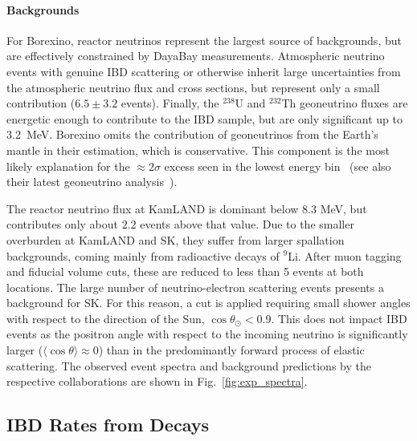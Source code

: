 \documentclass[
reprint,
superscriptaddress,
showpacs,
preprintnumbers,
nofootinbib,
nobibnotes,
amsmath,
amssymb, 
aps,
prd,
floatfix
]{revtex4-1}
\newcommand{\reffig}[1]{Fig.~\ref{#1}}
\begin{document}
\paragraph{Backgrounds} For Borexino, reactor neutrinos represent the largest source of backgrounds, but are effectively constrained by DayaBay measurements. Atmospheric neutrino events with genuine IBD scattering or otherwise inherit large uncertainties from the atmospheric neutrino flux and cross sections, but represent only a small contribution ($6.5\pm 3.2$ events). Finally, the $^{238}$U and $^{232}$Th geoneutrino fluxes are energetic enough to contribute to the IBD sample, but are only significant up to 3.2~MeV. Borexino omits the contribution of geoneutrinos from the Earth's mantle in their estimation, which is conservative. This component is the most likely explanation for the $\approx 2\sigma$ excess seen in the lowest energy bin~\cite{Agostini:2019yuq} (see also their latest geoneutrino analysis~\cite{Agostini:2019dbs}). 

The reactor neutrino flux at KamLAND is dominant below $8.3$ MeV, but contributes only about $2.2$ events above that value. Due to the smaller overburden at KamLAND and SK, they suffer from larger spallation backgrounds, coming mainly from radioactive decays of $^9$Li. After muon tagging and fiducial volume cuts, these are reduced to less than 5 events at both locations. The large number of neutrino-electron scattering events presents a background for SK. For this reason, a cut is applied requiring small shower angles with respect to the direction of the Sun, $\cos{\theta_{\odot}} < 0.9$. This does not impact IBD events as the positron angle with respect to the incoming neutrino is significantly larger ($\langle \cos{\theta}\rangle \approx  0$) than in the predominantly forward process of elastic scattering. The observed event spectra and background predictions by the respective collaborations are shown in \reffig{fig:exp_spectra}.

\subsection{IBD Rates from Decays} 
\end{document}

